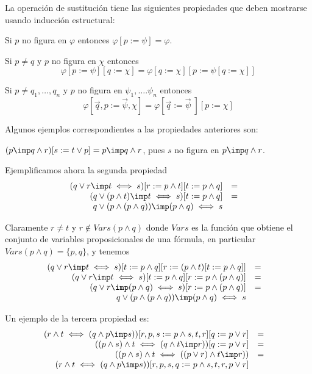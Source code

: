 \documentclass[11pt,letterpaper]{article}
\begin{document}
La operación de sustitución tiene las siguientes propiedades que deben 
mostrarse usando inducción estructural:
\bi
 \item Si $p$ no figura en $\varphi$ entonces $\varphi[p:=\psi]=\varphi$.

 \item Si $p\neq q$ y $p$ no figura en $\chi$ entonces
  $$ \varphi[p:=\psi][q:=\chi]=\varphi[q:=\chi][p:=\psi[q:=\chi]] $$

 \item Si $p\neq q_1,\ldots, q_n$ y $p$ no figura en $\psi_1,\ldots.\psi_n$
  entonces  
$$\varphi[\vec{q},p:=\vec{\psi},\chi]=\varphi[\vec{q}:=\vec{\psi}\;][p:=\chi]$$
\ei

\noindent Algunos ejemplos correspondientes a las propiedades anteriores son:
\bi
\item $(p\imp q\land r)[s:=t\lor p]=p\imp q\land r$, pues $s$ no figura en
  $p\imp q\land r$.
\item Ejemplificamos ahora la segunda propiedad 
\[
\begin{array}{rll}
(q\lor r\imp t\iff s)[r:=p\land t][t:= p\land q] & = & \\
(q\lor (p\land t)\imp t\iff s)[t:= p\land q] & = & \\ 
q\lor (p\land (p\land q))\imp (p\land q)\iff s
\end{array}
\]

Claramente $r \neq t$ y $r\notin Vars(p\land q)$ donde $Vars$ es la 
función que obtiene el conjunto de variables proposicionales de una fórmula, 
en particular $Vars(p\land q)=\{p,q\}$, y tenemos
\[
\begin{array}{rll}
(q\lor r\imp t\iff s)[t:= p\land q][r:=(p\land t)[t:=p\land q]] & = & \\
(q\lor r\imp t\iff s)[t:= p\land q][r:=p\land (p\land q)] & = & \\
(q\lor r\imp (p\land q)\iff s)[r:=p\land (p\land q)] & = & \\
q\lor (p\land (p\land q))\imp (p\land q)\iff s 
\end{array}
\]

\item Un ejemplo de la tercera propiedad es:
\[
\begin{array}{rll}
(r\land t \iff (q\land p\imp s))[r,p,s:=p\land s, t, r][q:= p\lor r] & = & \\
((p\land s)\land t \iff (q\land t\imp r))[q:= p\lor r] & = & \\
((p\land s)\land t \iff ((p\lor r)\land t\imp r)) & = & \\
(r\land t \iff (q\land p\imp s))[r,p,s,q:=p\land s, t, r, p\lor r]
\end{array}
\]
\ei
\end{document}
